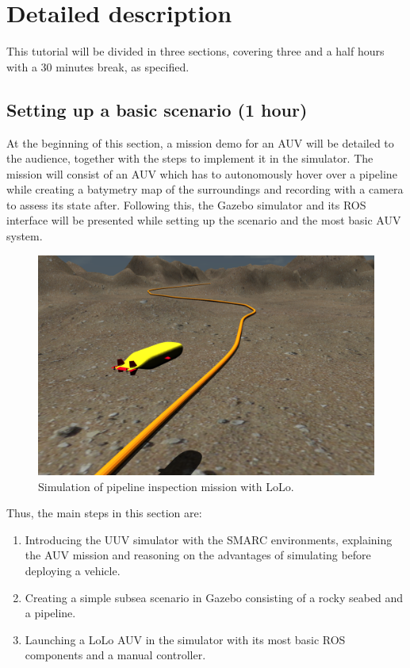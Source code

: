 \documentclass[
10pt, %
a4paper, %
oneside, %
headinclude,footinclude, %
BCOR5mm, %
]{scrartcl}
\title{\normalfont{Tutorial outline}} %
\date{} %
\begin{document}
\maketitle %

\section{Detailed description}
\label{sec:draft}
This tutorial will be divided in three sections, covering three and a half hours with a 30 minutes break, as specified. 

\subsection{\textbf{Setting up a basic scenario (1 hour)}}
At the beginning of this section, a mission demo for an AUV will be detailed to the audience, together with the steps to implement it in the simulator.
The mission will consist of an AUV which has to autonomously hover over a pipeline while creating a batymetry map of the surroundings and recording with a camera to assess its state after.
Following this, the Gazebo simulator and its ROS interface will be presented while setting up the scenario and the most basic AUV system.

\begin{figure}[h]
    \centering
    \includegraphics[width=0.9\linewidth]{Figures/sim_pipeline.png}
    \caption{Simulation of pipeline inspection mission with LoLo.}
\label{fig:lolo_gazebo}
\end{figure}

Thus, the main steps in this section are:
\begin{enumerate}
	\item Introducing the UUV simulator with the SMARC environments, explaining the AUV mission and reasoning on the advantages of simulating before deploying a vehicle.
	\item Creating a simple subsea scenario in Gazebo consisting of a rocky seabed and a pipeline.
	\item Launching a LoLo AUV in the simulator with its most basic ROS components and a manual controller.
\end{enumerate}
\end{document}
